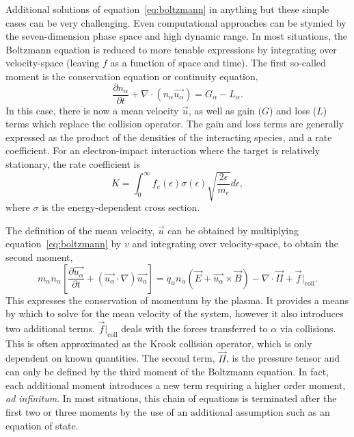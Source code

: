 Additional solutions of equation~\ref{eq:boltzmann} in anything but these simple
cases can be very challenging. Even computational approaches can be stymied by
the seven-dimension phase space and high dynamic range. In most situations, the
Boltzmann equation is reduced to more tenable expressions by integrating over
velocity-space (leaving $f$ as a function of space and time). The first
so-called moment is the conservation equation or continuity equation,
\begin{equation}\label{eq:cont}
  \frac{\partial n_\alpha}{\partial t} + \nabla \cdot (n_\alpha \vec{u_\alpha})
  = G_\alpha - L_\alpha.
\end{equation}
In this case, there is now a mean velocity $\vec{u}$, as well as gain ($G$) and
loss ($L$) terms which replace the collision operator. The gain and loss terms
are generally expressed as the product of the densities of the interacting
species, and a rate coefficient. For an electron-impact interaction where the
target is relatively stationary, the rate coefficient is
\begin{equation}
  K = \int_0^\infty f_e(\epsilon)\sigma(\epsilon)
      \sqrt{\frac{2\epsilon}{m_e}}d\epsilon,
\end{equation}
where $\sigma$ is the energy-dependent cross section.

The definition of the mean velocity, $\vec{u}$ can be obtained by multiplying
equation~\ref{eq:boltzmann} by $v$ and integrating over velocity-space, to
obtain the second moment,
\begin{equation}
  m_\alpha n_\alpha \left[ \frac{\partial \vec{u_\alpha}}{\partial t}
  + (\vec{u_\alpha} \cdot \nabla) \vec{u_\alpha}\right]
  = q_\alpha n_\alpha (\vec{E} + \vec{u_\alpha} \times \vec{B})
  - \nabla \cdot \vec{\Pi} + \vec{f}|_\mathrm{coll}.
  \label{eq:momentum}
\end{equation}
This expresses the conservation of momentum by the plasma. It provides a means
by which to solve for the mean velocity of the system, however it also
introduces two additional terms. $\vec{f}|_\mathrm{coll}$ deals with the forces
transferred to $\alpha$ via collisions. This is often approximated as the Krook
collision operator, which is only dependent on known quantities. The second
term, $\vec{\Pi}$, is the pressure tensor and can only be defined by the third
moment of the Boltzmann equation. In fact, each additional moment introduces a
new term requiring a higher order moment, \emph{ad infinitum}. In most
situations, this chain of equations is terminated after the first two or three
moments by the use of an additional assumption such as an equation of state.

